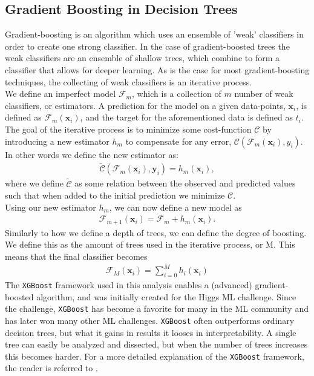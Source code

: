 \subsection{Gradient Boosting in Decision Trees}
Gradient-boosting is an algorithm which uses an ensemble of 'weak' 
classifiers in order to create one strong classifier. In the case of gradient-boosted 
trees the weak classifiers are an ensemble of shallow trees, which combine to form a classifier 
that allows for deeper learning. As is the case for most gradient-boosting 
techniques, the collecting of weak classifiers is an iterative process.
\\
We define an imperfect model $\mathcal{F}_m$, which is a collection of $m$ number of weak 
classifiers, or estimators. A prediction for the model on a given data-points, $\textbf{x}_i$, is 
defined as $\mathcal{F}_m(\textbf{x}_i)$, and the target for the aforementioned data is 
defined as $t_i$. The goal of the iterative process is to minimize some cost-function 
$\mathcal{C}$ by introducing a new estimator $h_m$ to compensate for any error, 
$\mathcal{C}(\mathcal{F}_m(\textbf{x}_i), y_i)$. In other words we define the new estimator as:
\begin{align}
    \tilde{\mathcal{C}}(\mathcal{F}_m(\textbf{x}_i), \textbf{y}_i) = h_m(\textbf{x}_i),
\end{align}
where we define $\tilde{\mathcal{C}}$ as some relation between the observed and 
predicted values such that when added to the initial prediction we minimize $\mathcal{C}$.
\\
Using our new estimator $h_m$, we can now define a new model as
\begin{align}
    \mathcal{F}_{m+1}(\textbf{x}_i) = \mathcal{F}_m + h_m (\textbf{x}_i).
\end{align}
Similarly to how we define a depth of trees, we can define the degree of boosting. We define 
this as the amount of trees used in the iterative process, or M. This means that the final classifier 
becomes
\begin{align}
    \mathcal{F}_M (\textbf{x}_i) = \sum_{i=0}^M h_i(\textbf{x}_i)
\end{align} 
The \verb!XGBoost! \cite{XGB} framework used in this analysis enables a (advanced) gradient-boosted algorithm, 
and was initially created for the Higgs ML challenge. Since the challenge, \verb!XGBoost! has become 
a favorite for many in the \ac{ML} community and has later won many other ML challenges. \verb!XGBoost! 
often outperforms ordinary decision trees, but what it gains in results it looses in 
interpretability. A single tree can easily be analyzed and dissected, but when the number 
of trees increases this becomes harder. For a more detailed explanation of the \verb!XGBoost! framework,
the reader is referred to \cite{XGB}.